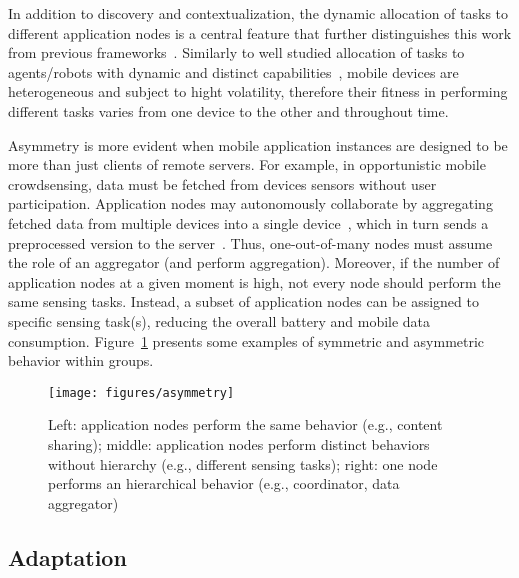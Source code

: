 In addition to discovery and contextualization, the dynamic allocation of tasks to different application nodes is a central feature that further distinguishes this work from previous frameworks~\cite{}. Similarly to well studied allocation of tasks to agents/robots with dynamic and distinct capabilities~\cite{}, mobile devices are heterogeneous and subject to hight volatility, therefore their fitness in performing different tasks varies from one device to the other and throughout time. 

Asymmetry is more evident when mobile application instances are designed to be more than just clients of remote servers. For example, in opportunistic mobile crowdsensing, data must be fetched from devices sensors without user participation. Application nodes may autonomously collaborate by aggregating fetched data from multiple devices into a single device~\cite{Rajagopalan:2006}, which in turn sends a preprocessed version to the server~\cite{}. Thus, one-out-of-many nodes must assume the role of an aggregator (and perform aggregation). Moreover, if the number of application nodes at a given moment is high, not every node should perform the same sensing tasks. Instead, a subset of application nodes can be assigned to specific sensing task(s), reducing the overall battery and mobile data consumption. Figure~\ref{fig:asymmetry} presents some examples of symmetric and asymmetric behavior within groups.


\begin{figure}[t!]
	\centering
	\texttt{[image: figures/asymmetry]}
	\caption{Left: application nodes perform the same behavior (e.g., content sharing); middle: application nodes perform distinct behaviors without hierarchy (e.g., different sensing tasks); right: one node performs an hierarchical behavior (e.g., coordinator, data aggregator)}
	\label{fig:asymmetry}
\end{figure}

\subsection{Adaptation}

